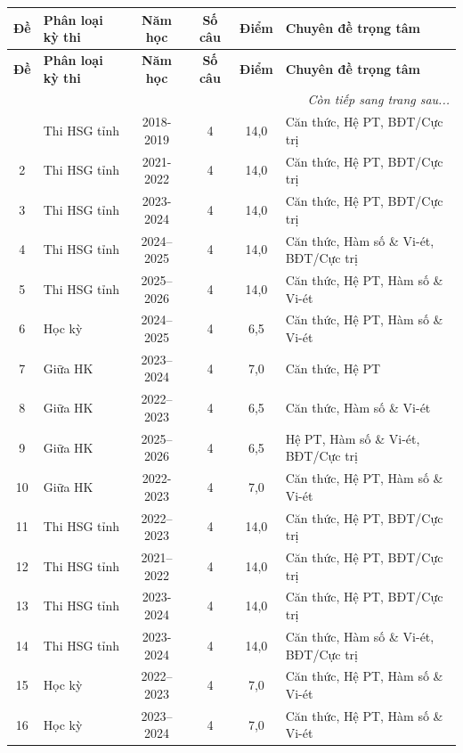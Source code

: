 \begin{center}
\small
\begin{longtable}{|c|l|c|c|c|p{4.2cm}|}
\hline
\textbf{Đề} & \textbf{Phân loại kỳ thi} & \textbf{Năm học} & \textbf{Số câu} & \textbf{Điểm} & \textbf{Chuyên đề trọng tâm} \\ \hline
\endfirsthead
\hline
\textbf{Đề} & \textbf{Phân loại kỳ thi} & \textbf{Năm học} & \textbf{Số câu} & \textbf{Điểm} & \textbf{Chuyên đề trọng tâm} \\ \hline
\endhead
\hline \multicolumn{6}{|r|}{\textit{Còn tiếp sang trang sau...}} \\ \hline
\endfoot
\hline
\endlastfoot
1 & Thi HSG tỉnh & 2018-2019 & 4 & 14,0 & Căn thức, Hệ PT, BĐT/Cực trị \\ \hline
2 & Thi HSG tỉnh & 2021-2022 & 4 & 14,0 & Căn thức, Hệ PT, BĐT/Cực trị \\ \hline
3 & Thi HSG tỉnh & 2023-2024 & 4 & 14,0 & Căn thức, Hệ PT, BĐT/Cực trị \\ \hline
4 & Thi HSG tỉnh & 2024--2025 & 4 & 14,0 & Căn thức, Hàm số \& Vi-ét, BĐT/Cực trị \\ \hline
5 & Thi HSG tỉnh & 2025--2026 & 4 & 14,0 & Căn thức, Hệ PT, Hàm số \& Vi-ét \\ \hline
6 & Học kỳ & 2024--2025 & 4 & 6,5 & Căn thức, Hệ PT, Hàm số \& Vi-ét \\ \hline
7 & Giữa HK & 2023--2024 & 4 & 7,0 & Căn thức, Hệ PT \\ \hline
8 & Giữa HK & 2022--2023 & 4 & 6,5 & Căn thức, Hàm số \& Vi-ét \\ \hline
9 & Giữa HK & 2025--2026 & 4 & 6,5 & Hệ PT, Hàm số \& Vi-ét, BĐT/Cực trị \\ \hline
10 & Giữa HK & 2022-2023 & 4 & 7,0 & Căn thức, Hệ PT, Hàm số \& Vi-ét \\ \hline
11 & Thi HSG tỉnh & 2022--2023 & 4 & 14,0 & Căn thức, Hệ PT, BĐT/Cực trị \\ \hline
12 & Thi HSG tỉnh & 2021--2022 & 4 & 14,0 & Căn thức, Hệ PT, BĐT/Cực trị \\ \hline
13 & Thi HSG tỉnh & 2023-2024 & 4 & 14,0 & Căn thức, Hệ PT, BĐT/Cực trị \\ \hline
14 & Thi HSG tỉnh & 2023-2024 & 4 & 14,0 & Căn thức, Hàm số \& Vi-ét, BĐT/Cực trị \\ \hline
15 & Học kỳ & 2022--2023 & 4 & 7,0 & Căn thức, Hệ PT, Hàm số \& Vi-ét \\ \hline
16 & Học kỳ & 2023--2024 & 4 & 7,0 & Căn thức, Hệ PT, Hàm số \& Vi-ét \\ \hline

\end{longtable}
\end{center}
